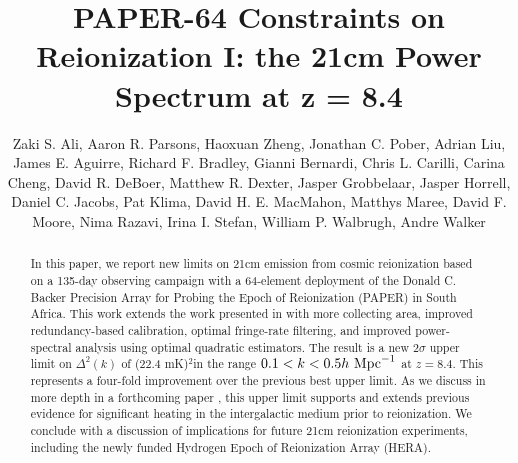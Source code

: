 \documentclass[twocolumn,numberedappendix]{emulateapj} \shorttitle{PSA64}
\newcommand{\hMpci}{h\ {\rm Mpc}^{-1}}
\newcommand{\mKlimit}{(22.4 mK)$^2$}
\begin{document}
\title{PAPER-64 Constraints on Reionization I: the 21cm Power Spectrum at z = 8.4}

\author{
Zaki S. Ali, 
Aaron R. Parsons, 
Haoxuan Zheng,
Jonathan C. Pober, 
Adrian Liu, 
James E. Aguirre,
Richard F. Bradley,
Gianni Bernardi, 
Chris L. Carilli,
Carina Cheng,
David R. DeBoer, 
Matthew R. Dexter,
Jasper Grobbelaar,
Jasper Horrell,
Daniel C. Jacobs, 
Pat Klima,
David H. E. MacMahon,
Matthys Maree,
David F. Moore,
Nima Razavi,
Irina I. Stefan,
William P. Walbrugh,
Andre Walker
}


\begin{abstract}
In this paper, we report new limits on 21cm emission from cosmic reionization
based on a 135-day observing campaign with a 64-element deployment of the
Donald C. Backer Precision Array for Probing the Epoch of Reionization (PAPER)
in South Africa.  This work extends the work presented in
\citet{parsons_et_al2014} with more collecting area, improved redundancy-based
calibration, optimal fringe-rate filtering, and improved power-spectral
analysis using optimal quadratic estimators. The result is a new $2\sigma$
upper limit on $\Delta^2(k)$ of \mKlimit in the range
$0.1<k<0.5\hMpci$ at $z=8.4$.  This represents a four-fold improvement over the
previous best upper limit.  As we discuss in more depth in a forthcoming
paper \citep{pober_et_al2015}, this upper limit supports and extends
previous evidence for significant heating in the intergalactic medium prior to
reionization. We conclude with a discussion of implications for future 21cm
reionization experiments, including the newly funded Hydrogen Epoch of
Reionization Array (HERA).  
\end{abstract}
\end{document}
